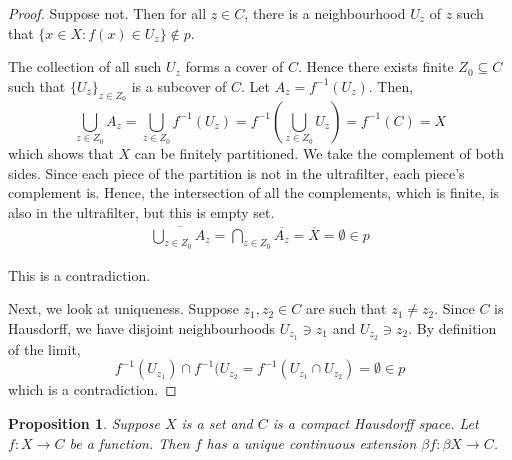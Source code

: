 \documentclass[11pt,letterpaper]{article}
\newtheorem{prop}{Proposition}
\newcommand{\inv}{^{-1}}
\newcommand{\Union}{\bigcup}
\newcommand{\Intersn}{\bigcap}
\newcommand{\parens}[1]{\left(#1\right)}
\newcommand{\compl}{\overline}
\newcommand{\intersn}{\cap}
\begin{document}
\begin{proof}
    Suppose not. Then for all $z \in C$, there is a neighbourhood $U_z$ of $z$
    such that $\{ x \in X : f(x) \in U_z \} \notin p$.

    The collection of all such $U_z$ forms a cover of $C$. Hence there exists
    finite $Z_0 \subseteq C$ such that $\{U_z\}_{z \in Z_0}$ is a subcover of
    $C$. Let $A_z = f\inv (U_z)$. Then,
    \begin{equation*}
        \Union_{z \in Z_0} A_z
        = \Union_{z \in Z_0} f\inv (U_z)
        = f\inv \parens{ \Union_{z \in Z_0} U_z }
        = f\inv (C)
        = X
    \end{equation*}
    which shows that $X$ can be finitely partitioned. We take the complement of
    both sides. Since each piece of the partition is not in the ultrafilter,
    each piece's complement is. Hence, the intersection of all the complements,
    which is finite, is also in the ultrafilter, but this is empty set.
    \begin{align*}
        \compl{ \Union_{z \in Z_0} A_z }
        = \Intersn_{z \in Z_0} \compl{A_z}
        = \compl{X}
        = \emptyset
        \in p
    \end{align*}

    This is a contradiction.

    Next, we look at uniqueness. Suppose $z_1, z_2 \in C$ are such that
    $z_1 \neq z_2$. Since $C$ is Hausdorff, we have disjoint neighbourhoods
    $U_{z_1} \ni z_1$ and $U_{z_2} \ni z_2$. By definition of the limit,
    \begin{equation*}
        f\inv (U_{z_1}) \intersn f\inv (U_{z_2}
        = f\inv (U_{z_1} \intersn U_{z_2})
        = \emptyset
        \in p
    \end{equation*}
    which is a contradiction.
\end{proof}

\begin{prop}
    Suppose $X$ is a set and $C$ is a compact Hausdorff space.
    Let $f : X \to C$ be a function. Then $f$ has a unique continuous extension
    $\beta f : \beta X \to C$.
\end{prop}
\end{document}
